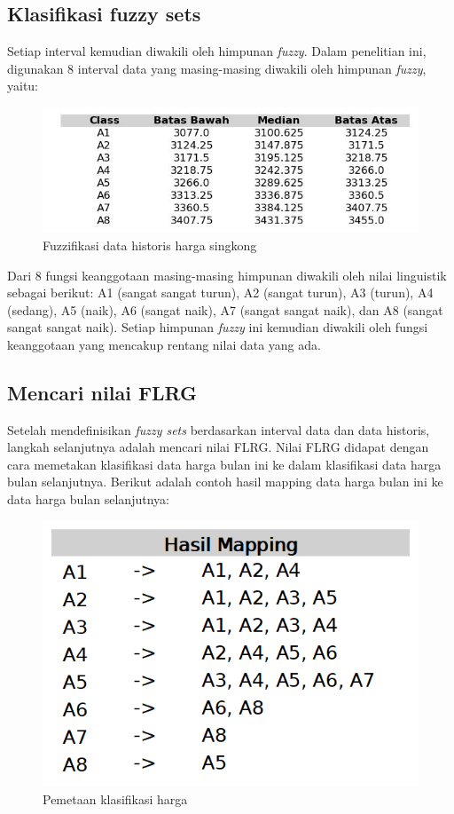 \documentclass[conference]{IEEEtran}
\begin{document}
\subsection{Klasifikasi fuzzy sets}
Setiap interval kemudian diwakili oleh himpunan \textit{fuzzy}. Dalam penelitian ini, digunakan 8 interval data yang masing-masing diwakili oleh himpunan \textit{fuzzy}, yaitu:
\begin{figure}[H]
    \centering
    \includegraphics[width=\columnwidth]{images/table.jpg} 
    \caption{Fuzzifikasi data historis harga singkong}
\end{figure}
Dari 8 fungsi keanggotaan masing-masing himpunan diwakili oleh nilai linguistik sebagai berikut: A1 (sangat sangat turun), A2 (sangat turun), A3 (turun), A4 (sedang), A5 (naik), A6 (sangat naik), A7 (sangat sangat naik), dan A8 (sangat sangat sangat naik). Setiap himpunan \textit{fuzzy} ini kemudian diwakili oleh fungsi keanggotaan yang mencakup rentang nilai data yang ada. 

\subsection{Mencari nilai FLRG}
Setelah mendefinisikan \textit{fuzzy sets} berdasarkan interval data dan data historis, langkah selanjutnya adalah mencari nilai FLRG. Nilai FLRG didapat dengan cara memetakan klasifikasi data harga bulan ini ke dalam klasifikasi data harga bulan selanjutnya. Berikut adalah contoh hasil mapping data harga bulan ini ke data harga bulan selanjutnya:

\begin{figure}[H]
    \centering
    \includegraphics[scale=0.3]{images/hasil_mapping.png} 
    \caption{Pemetaan klasifikasi harga}
\end{figure}
\end{document}
